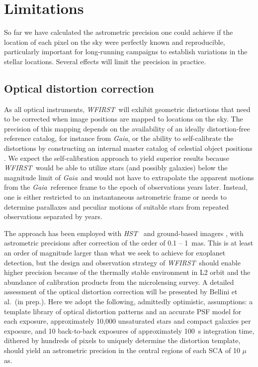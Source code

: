 \documentclass[modern, times]{aastex61}
\newcommand\wfirst{\textit{WFIRST}}
\newcommand\gaia{\textit{Gaia}}
\newcommand\hst{\textit{HST}}
\begin{document}
\section{Limitations}
\label{sec:limitations}

So far we have calculated the astrometric precision one could achieve if the location of each pixel on the sky were perfectly known and reproducible, particularly important for long-running campaigns to establish variations in the stellar locations.
Several effects will limit the precision in practice.

\subsection{Optical distortion correction}

As all optical instruments, \wfirst\ will exhibit geometric distortions that need to be corrected when image positions are mapped to locations on the sky.
The precision of this mapping depends on the availability of an ideally distortion-free reference catalog, for instance from \gaia, or the ability to self-calibrate the distortions by constructing an internal master catalog of celestial object positions \citep[e.g.][]{Anderson2003}.
We expect the self-calibration approach to yield superior results because \wfirst\ would be able to utilize stars (and possibly galaxies) below the magnitude limit of \gaia\ and would not have to extrapolate the apparent motions from the \gaia\ reference frame to the epoch of observations years later.
Instead, one is either restricted to an instantaneous astrometric frame or needs to determine parallaxes and peculiar motions of suitable stars from repeated observations separated by years.

The approach has been employed with \hst\ \citep{Anderson2003,Bellini2011} and ground-based imagers \citep{Libralato2014}, with astrometric precisions after correction of the order of 0.1 -- 1~mas.
This is at least an order of magnitude larger than what we seek to achieve for exoplanet detection, but the design and observation strategy of \wfirst\ should enable higher precision because of the thermally stable environment in L2 orbit and the abundance of calibration products from the microlensing survey.
A detailed assessment of the optical distortion correction will be presented by Bellini et al.~(in prep.). 
Here we adopt the following, admittedly optimistic, assumptions:
a template library of optical distortion patterns and an accurate PSF model for each exposure, approximately 10,000 unsaturated stars and compact galaxies per exposure, and 10 back-to-back exposures of approximately 100~s integration time, dithered by hundreds of pixels to uniquely determine the distortion template, should yield an astrometric precision in the central regions of each SCA of 10 $\mu$as.
\end{document}
